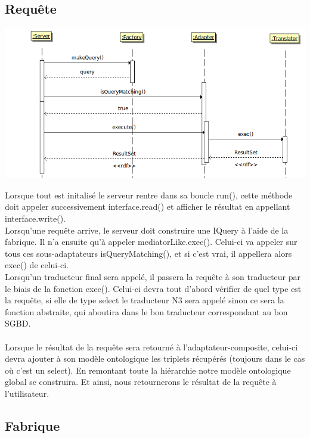 \documentclass[12pt]{article}
\begin{document}
\subsection{Requête}

\begin{center}
	\includegraphics[scale=0.60]{images/sequence_requete.png}
\end{center}

Lorsque tout est initalisé le serveur rentre dans sa boucle run(), cette méthode doit appeler successivement interface.read() et afficher le résultat en appellant interface.write(). \\

\indent Lorsqu'une requête arrive, le serveur doit construire une IQuery à l'aide de la fabrique. Il n'a ensuite qu'à appeler mediatorLike.exec(). Celui-ci va appeler sur tous ces sous-adaptateurs isQueryMatching(), et si c'est vrai, il appellera alors exec() de celui-ci. \\
\indent Lorsqu'un traducteur final sera appelé, il passera la requête à son traducteur par le biais de la fonction exec(). Celui-ci devra tout d'abord vérifier de quel type est la requête, si elle de type select le traducteur N3 sera appelé sinon ce sera la fonction abstraite, qui aboutira dans le bon traducteur correspondant au bon SGBD. \\

\\ Lorsque le résultat de la requête sera retourné à l'adaptateur-composite, celui-ci devra ajouter à son modèle ontologique les triplets récupérés (toujours dans le cas où c'est un select). En remontant toute la hiérarchie notre modèle ontologique global se construira. Et ainsi, nous retournerons le résultat de la requête à l'utilisateur.

\subsection{Fabrique}
\end{document}

